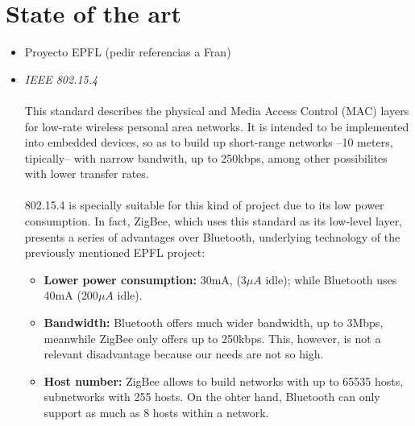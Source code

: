 	\section{State of the art}
		\begin{itemize}
			\item Proyecto EPFL (pedir referencias a Fran)
			\item \emph{IEEE 802.15.4}\\\\
				This standard describes the physical and Media Access Control (MAC) layers for low-rate wireless
				personal area networks. It is intended to be implemented into embedded devices, so as to build up
				short-range networks --10 meters, tipically-- with narrow bandwith, up to 250kbps, among other
				possibilites with lower transfer rates.\\\\
				802.15.4 is specially suitable for this kind of project due to its low power consumption. In
				fact, ZigBee, which uses this standard as its low-level layer, presents a series of advantages
				over Bluetooth, underlying technology of the previously mentioned EPFL project:
				\begin{itemize}
					\item \textbf{Lower power consumption:} 30mA, ($3\mu A$ idle); while Bluetooth uses 40mA 
						($200\mu A$ idle).
					\item \textbf{Bandwidth:} Bluetooth offers much wider bandwidth, up to 3Mbps, meanwhile ZigBee 
						only offers up to 250kbps. This, however, is not a relevant disadvantage because our needs 
						are not so high.
					\item \textbf{Host number:} ZigBee allows to build networks with up to 65535 hosts, subnetworks 
						with 255 hosts. On the ohter hand, Bluetooth can only support as much as 8 hosts within a 
						network. 
				\end{itemize}

\end{itemize}
